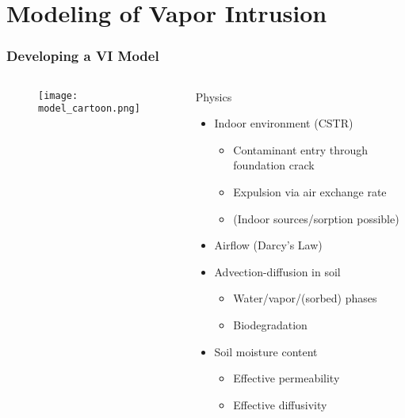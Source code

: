 \section{Modeling of Vapor Intrusion}


\begin{frame}
  \frametitle{Developing a VI Model}
\begin{columns}[T]
    \begin{column}{0.5\textwidth}
      \begin{figure}
        \texttt{[image: model\_cartoon.png]}
      \end{figure}
    \end{column}
    \begin{column}{0.5\textwidth}
      \begin{block}{Physics}
        \begin{itemize}
          \item Indoor environment (CSTR)
          \begin{itemize}
            \item Contaminant entry through foundation crack
            \item Expulsion via air exchange rate
            \item (Indoor sources/sorption possible)
          \end{itemize}
          \item Airflow (Darcy's Law)
          \item Advection-diffusion in soil
          \begin{itemize}
            \item Water/vapor/(sorbed) phases
            \item Biodegradation
          \end{itemize}
          \item Soil moisture content
          \begin{itemize}
            \item Effective permeability
            \item Effective diffusivity
          \end{itemize}
        \end{itemize}
      \end{block}
    \end{column}
  \end{columns}
\end{frame}


